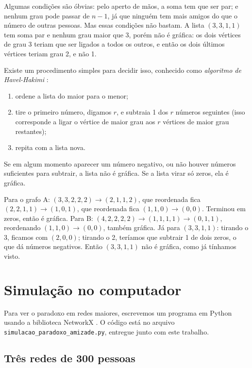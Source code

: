 \documentclass[12pt,a4paper]{article}
\theoremstyle{plain}
\theoremstyle{definition}
\theoremstyle{remark}
\begin{document}
Algumas condições são óbvias: pelo aperto de mãos, a soma tem que ser
par; e nenhum grau pode passar de $n-1$, já que ninguém tem mais amigos
do que o número de outras pessoas. Mas essas condições não bastam. A
lista $(3,3,1,1)$ tem soma par e nenhum grau maior que 3, porém não é
gráfica: os dois vértices de grau 3 teriam que ser ligados a todos os
outros, e então os dois últimos vértices teriam grau 2, e não 1.

Existe um procedimento simples para decidir isso, conhecido como
\emph{algoritmo de Havel-Hakimi} \cite{havel,hakimi}:
\begin{enumerate}
  \item ordene a lista do maior para o menor;
  \item tire o primeiro número, digamos $r$, e subtraia 1 dos $r$ números seguintes
        (isso corresponde a ligar o vértice de maior grau aos $r$ vértices de maior grau restantes);
  \item repita com a lista nova.
\end{enumerate}
Se em algum momento aparecer um número negativo, ou não houver números
suficientes para subtrair, a lista não é gráfica. Se a lista virar só
zeros, ela é gráfica.

Para o grafo A: $(3,3,2,2,2) \to (2,1,1,2)$, que reordenada fica
$(2,2,1,1) \to (1,0,1)$, que reordenada fica $(1,1,0) \to (0,0)$.
Terminou em zeros, então é gráfica. Para B:
$(4,2,2,2,2)\to(1,1,1,1)\to(0,1,1)$, reordenando $(1,1,0)\to(0,0)$,
também gráfica. Já para $(3,3,1,1)$: tirando o 3, ficamos com
$(2,0,0)$; tirando o 2, teríamos que subtrair 1 de dois zeros, o que dá
números negativos. Então $(3,3,1,1)$ não é gráfica, como já tínhamos
visto.

\section{Simulação no computador}\label{sec:simulacao}

Para ver o paradoxo em redes maiores, escrevemos um programa em Python
usando a biblioteca NetworkX \cite{networkx}. O código está no arquivo
\texttt{simulacao\_paradoxo\_amizade.py}, entregue junto com este trabalho.

\subsection{Três redes de 300 pessoas}
\end{document}
